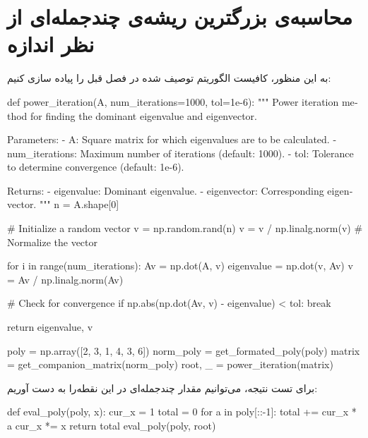 \section{محاسبه‌ی بزرگترین ریشه‌ی چندجمله‌ای از نظر اندازه}
به این منظور، کافیست الگوریتم توصیف شده در فصل قبل را پیاده سازی کنیم:


\begin{latin}
  \begin{python}

def power_iteration(A, num_iterations=1000, tol=1e-6):
    """
    Power iteration method for finding the dominant eigenvalue and eigenvector.

    Parameters:
    - A: Square matrix for which eigenvalues are to be calculated.
    - num_iterations: Maximum number of iterations (default: 1000).
    - tol: Tolerance to determine convergence (default: 1e-6).

    Returns:
    - eigenvalue: Dominant eigenvalue.
    - eigenvector: Corresponding eigenvector.
    """
    n = A.shape[0]

    # Initialize a random vector
    v = np.random.rand(n)
    v = v / np.linalg.norm(v)  # Normalize the vector

    for i in range(num_iterations):
        Av = np.dot(A, v)
        eigenvalue = np.dot(v, Av)
        v = Av / np.linalg.norm(Av)

        # Check for convergence
        if np.abs(np.dot(Av, v) - eigenvalue) < tol:
            break

    return eigenvalue, v
  \end{python}
\end{latin}



\begin{latin}
  \begin{python}

poly = np.array([2, 3, 1, 4, 3, 6])
norm_poly = get_formated_poly(poly)
matrix = get_companion_matrix(norm_poly)
root, _ = power_iteration(matrix)


  \end{python}
\end{latin}

برای تست نتیجه، می‌توانیم مقدار چندجمله‌ای در این نقطه‌را به دست آوریم:


\begin{latin}
  \begin{python}

def eval_poly(poly, x):
    cur_x = 1
    total = 0
    for a in poly[::-1]:
        total += cur_x * a
        cur_x *= x
    return total
eval_poly(poly, root)

  \end{python}
\end{latin}
